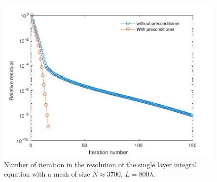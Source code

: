 \documentclass[a4paper]{article}
\begin{document}
\vspace{-1cm}
\begin{figure}[H]
	\centering
	\includegraphics[scale=0.5]{figs/PrecondDirichletHelmSegPDF}
	\caption{Number of iteration in the resolution of the single layer integral equation with a mesh of size $N \approx 3700$, $L = 800 \lambda$.}
	\label{FigureNitHelmDirichlet}
\end{figure}
\end{document}
